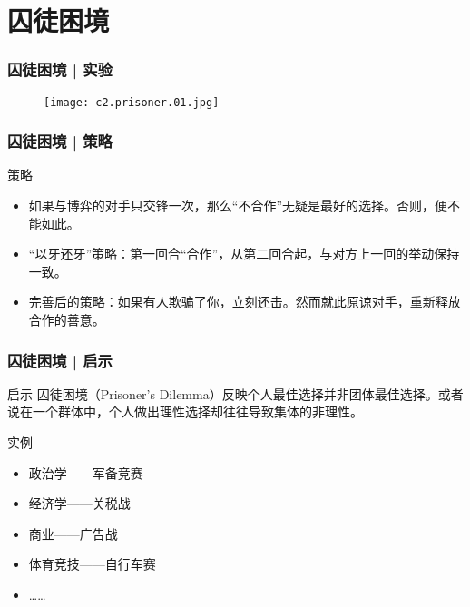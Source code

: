 \section{囚徒困境}
\begin{frame}
  \frametitle{囚徒困境 | 实验}
  \begin{figure}
    \centering
    \texttt{[image: c2.prisoner.01.jpg]}
  \end{figure}
\end{frame}

\begin{frame}
  \frametitle{囚徒困境 | 策略}
  \begin{block}{策略}
    \begin{itemize}
      \item 如果与博弈的对手只交锋一次，那么“不合作”无疑是最好的选择。否则，便不能如此。
      \item “以牙还牙”策略：第一回合“合作”，从第二回合起，与对方上一回的举动保持一致。
      \item 完善后的策略：如果有人欺骗了你，立刻还击。然而就此原谅对手，重新释放合作的善意。
    \end{itemize}
  \end{block}
\end{frame}

\begin{frame}
  \frametitle{囚徒困境 | 启示}
  \begin{block}{启示}
    囚徒困境（Prisoner's Dilemma）反映个人最佳选择并非团体最佳选择。或者说在一个群体中，个人做出理性选择却往往导致集体的非理性。
  \end{block}
  \pause
  \begin{block}{实例}
    \begin{itemize}
      \item 政治学——军备竞赛
      \item 经济学——关税战
      \item 商业——广告战
      \item 体育竞技——自行车赛
      \item ……
    \end{itemize}
  \end{block}
\end{frame}

